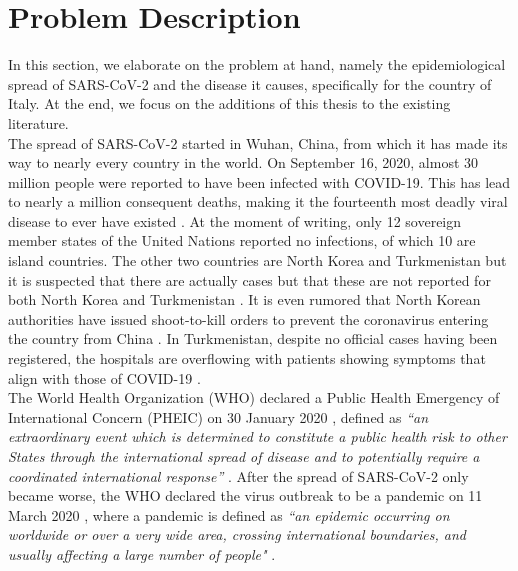 \documentclass[12pt]{article}
\begin{document}
	\section{Problem Description} \label{sec:problem_description}
	In this section, we elaborate on the problem at hand, namely the epidemiological spread of SARS-CoV-2 and the disease it causes, specifically for the country of Italy. At the end, we focus on the additions of this thesis to the existing literature. \\
	
	The spread of SARS-CoV-2 started in Wuhan, China, from which it has made its way to nearly every country in the world. On September 16, 2020, almost 30 million people were reported to have been infected with COVID-19. This has lead to nearly a million consequent deaths, making it the fourteenth most deadly viral disease to ever have existed \parencite{lepan2020historyPandemics}. At the moment of writing, only 12 sovereign member states of the United Nations reported no infections, of which 10 are island countries. The other two countries are North Korea and Turkmenistan but it is suspected that there are actually cases but that these are not reported for both North Korea \parencite{nebehay2020dprk} and Turkmenistan \parencite{hrw2020turkmenistan}. It is even rumored that North Korean authorities have issued shoot-to-kill orders to prevent the coronavirus entering the country from China \parencite{bangkok2020deathrate}. In Turkmenistan, despite no official cases having been registered, the hospitals are overflowing with patients showing symptoms that align with those of COVID-19 \parencite{RFERL2020Turkmenistan}. \\
	
	The World Health Organization (WHO) declared a Public Health Emergency of International Concern (PHEIC) on 30 January 2020 \parencite{who2020pheic}, defined as \textit{``an extraordinary event which is determined to constitute a public health risk to other States through the international spread of disease and to potentially require a coordinated international response”} \parencite{who2019ihr}. After the spread of SARS-CoV-2 only became worse, the WHO declared the virus outbreak to be a pandemic on 11 March 2020 \parencite{who2020pandemic}, where a pandemic is defined as \textit{``an epidemic occurring on worldwide or over a very wide area, crossing international boundaries, and usually affecting a large number of people"} \parencite{porta2014dictionary}. \\
	
\end{document}
